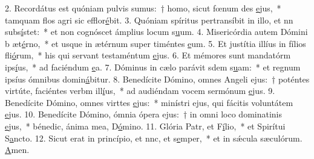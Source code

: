 2. Recordátus est quóniam pulvis sumus:~† homo, sicut fœnum des \uline{e}jus,~* tamquam flos agri sic efflor\uline{é}bit.
3. Quóniam spíritus pertransíbit in illo, et nn subs\uline{í}stet:~* et non cognóscet ámplius locum s\uline{u}um.
4. Misericórdia autem Dómini b æt\uline{é}rno,~* et usque in ætérnum super timéntes \uline{e}um.
5. Et justítia illíus in fílios fli\uline{ó}rum,~* his qui servant testaméntum \uline{e}jus.
6. Et mémores sunt mandatórm ips\uline{í}us,~* ad faciéndum \uline{e}a.
7. Dóminus in cælo parávit sdem s\uline{u}am:~* et regnum ipsíus ómnibus domin\uline{á}bitur.
8. Benedícite Dómino, omnes Angeli ejus:~† poténtes virtúte, faciéntes verbm ill\uline{í}us,~* ad audiéndam vocem sermónum \uline{e}jus.
9. Benedícite Dómino, omnes virttes \uline{e}jus:~* minístri ejus, qui fácitis voluntátem \uline{e}jus.
10. Benedícite Dómino, ómnia ópera ejus:~† in omni loco dominatinis \uline{e}jus,~* bénedic, ánima mea, D\uline{ó}mino.
11. Glória Patr, et F\uline{í}lio,~* et Spirítui S\uline{a}ncto.
12. Sicut erat in princípio, et nnc, et s\uline{e}mper,~* et in sǽcula sæculórum. \uline{A}men.
